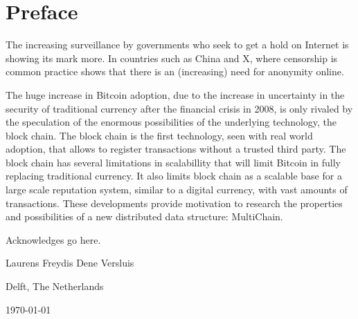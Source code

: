 \chapter*{Preface}
The increasing surveillance by governments who seek to get a hold on Internet is showing its mark more.
In countries such as China and X, where censorship is common practice shows that there is an (increasing) need for anonymity online.

The huge increase in Bitcoin adoption, 
due to the increase in uncertainty in the security of traditional currency 
after the financial crisis in 2008, 
is only rivaled by the speculation of the enormous possibilities 
of the underlying technology, the block chain.
The block chain is the first technology, seen with real world adoption,
that allows to register transactions without a trusted third party.
The block chain has several limitations in scalabillity
that will limit Bitcoin in fully replacing traditional currency.
It also limits block chain as a scalable base for a large scale reputation system,
similar to a digital currency, with vast amounts of transactions.
These developments provide motivation to research the properties and possibilities of a new distributed data structure:
MultiChain.

\vspace{1\baselineskip}

\noindent
Acknowledges go here.

\vspace{1\baselineskip}

\noindent
Laurens Freydis Dene Versluis

\vspace{1\baselineskip}

\noindent
Delft, The Netherlands

\noindent
\today
